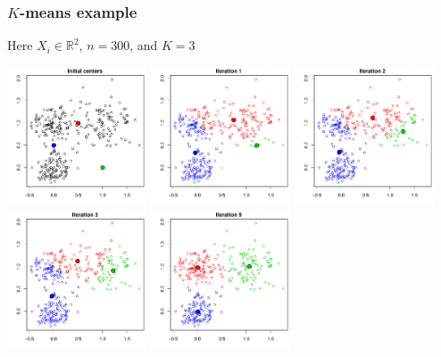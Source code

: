 \documentclass[mathserif]{beamer}
\def\R{\mathds{R}}
\begin{document}
\begin{frame}
\frametitle{$K$-means example}
\smallskip
\smallskip
Here $X_i \in \R^2$, $n=300$, and $K=3$

\begin{center}
\includegraphics[width=0.31\textwidth]{km0.pdf}
\hspace{3pt}
\includegraphics[width=0.31\textwidth]{km1.pdf} 
\hspace{3pt}
\includegraphics[width=0.31\textwidth]{km2.pdf} \\
\smallskip
\includegraphics[width=0.31\textwidth]{km3.pdf} 
\hspace{3pt}
\includegraphics[width=0.31\textwidth]{km9.pdf} 
\end{center}
\end{frame}
\end{document}
